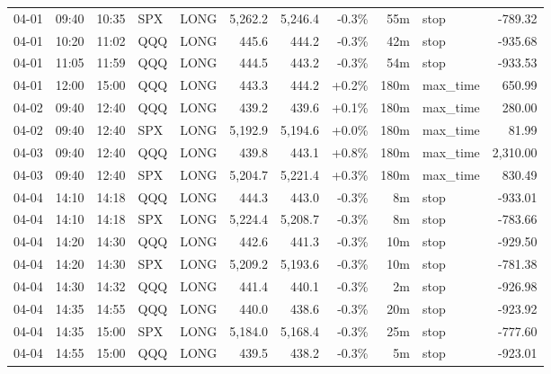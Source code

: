 \documentclass[11pt,a4paper,twoside]{article}
\begin{document}
\begin{center}
\begin{longtable}{>{\color{txtmain}}l l l l l r r r r >{\color{txtmain}}l r}
04-01 & 09:40 & 10:35 & SPX & LONG & 5,262.2 & 5,246.4 & \textcolor{lossred}{-0.3\%} & 55m & stop & \textcolor{lossred}{-789.32} \\
04-01 & 10:20 & 11:02 & QQQ & LONG & 445.6 & 444.2 & \textcolor{lossred}{-0.3\%} & 42m & stop & \textcolor{lossred}{-935.68} \\
04-01 & 11:05 & 11:59 & QQQ & LONG & 444.5 & 443.2 & \textcolor{lossred}{-0.3\%} & 54m & stop & \textcolor{lossred}{-933.53} \\
04-01 & 12:00 & 15:00 & QQQ & LONG & 443.3 & 444.2 & \textcolor{wingreen}{+0.2\%} & 180m & max\_time & \textcolor{wingreen}{650.99} \\
04-02 & 09:40 & 12:40 & QQQ & LONG & 439.2 & 439.6 & \textcolor{wingreen}{+0.1\%} & 180m & max\_time & \textcolor{wingreen}{280.00} \\
04-02 & 09:40 & 12:40 & SPX & LONG & 5,192.9 & 5,194.6 & \textcolor{wingreen}{+0.0\%} & 180m & max\_time & \textcolor{wingreen}{81.99} \\
04-03 & 09:40 & 12:40 & QQQ & LONG & 439.8 & 443.1 & \textcolor{wingreen}{+0.8\%} & 180m & max\_time & \textcolor{wingreen}{2,310.00} \\
04-03 & 09:40 & 12:40 & SPX & LONG & 5,204.7 & 5,221.4 & \textcolor{wingreen}{+0.3\%} & 180m & max\_time & \textcolor{wingreen}{830.49} \\
04-04 & 14:10 & 14:18 & QQQ & LONG & 444.3 & 443.0 & \textcolor{lossred}{-0.3\%} & 8m & stop & \textcolor{lossred}{-933.01} \\
04-04 & 14:10 & 14:18 & SPX & LONG & 5,224.4 & 5,208.7 & \textcolor{lossred}{-0.3\%} & 8m & stop & \textcolor{lossred}{-783.66} \\
04-04 & 14:20 & 14:30 & QQQ & LONG & 442.6 & 441.3 & \textcolor{lossred}{-0.3\%} & 10m & stop & \textcolor{lossred}{-929.50} \\
04-04 & 14:20 & 14:30 & SPX & LONG & 5,209.2 & 5,193.6 & \textcolor{lossred}{-0.3\%} & 10m & stop & \textcolor{lossred}{-781.38} \\
04-04 & 14:30 & 14:32 & QQQ & LONG & 441.4 & 440.1 & \textcolor{lossred}{-0.3\%} & 2m & stop & \textcolor{lossred}{-926.98} \\
04-04 & 14:35 & 14:55 & QQQ & LONG & 440.0 & 438.6 & \textcolor{lossred}{-0.3\%} & 20m & stop & \textcolor{lossred}{-923.92} \\
04-04 & 14:35 & 15:00 & SPX & LONG & 5,184.0 & 5,168.4 & \textcolor{lossred}{-0.3\%} & 25m & stop & \textcolor{lossred}{-777.60} \\
04-04 & 14:55 & 15:00 & QQQ & LONG & 439.5 & 438.2 & \textcolor{lossred}{-0.3\%} & 5m & stop & \textcolor{lossred}{-923.01} \\

\end{longtable}
\end{center}
\end{document}
